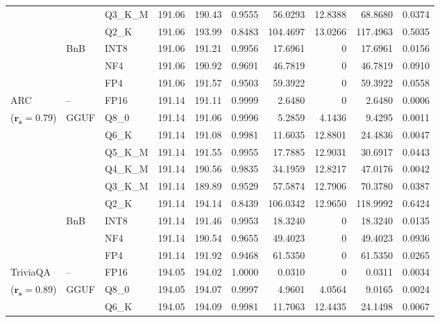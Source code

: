 \begin{longtable}{ll l rrrrrrr}
 &  & Q3\_K\_M & 191.06 & 190.43 & 0.9555 & 56.0293 & 12.8388 & 68.8680 & 0.0374 \\
 &  & Q2\_K & 191.06 & 193.99 & \cellcolor{red!18} 0.8483 & \cellcolor{red!18} 104.4697 & 13.0266 & \cellcolor{red!18} 117.4963 & \cellcolor{red!18} 0.5035 \\
 & BnB & INT8 & 191.06 & 191.21 & 0.9956 & 17.6961 & \cellcolor{cyan!12} $0$ & 17.6961 & 0.0156 \\
 &  & NF4 & 191.06 & 190.92 & 0.9691 & 46.7819 & \cellcolor{cyan!12} $0$ & 46.7819 & 0.0910 \\
 &  & FP4 & 191.06 & 191.57 & 0.9503 & 59.3922 & \cellcolor{cyan!12} $0$ & 59.3922 & 0.0558 \\
\midrule
ARC & -- & FP16 & 191.14 & 191.11 & 0.9999 & 2.6480 & \cellcolor{cyan!12} $0$ & 2.6480 & 0.0006 \\
{\small ($\mathbf{r_s{=}0.79}$)} & GGUF & Q8\_0 & 191.14 & 191.06 & 0.9996 & 5.2859 & 4.1436 & 9.4295 & 0.0011 \\
 &  & Q6\_K & 191.14 & 191.08 & 0.9981 & 11.6035 & 12.8801 & 24.4836 & 0.0047 \\
 &  & Q5\_K\_M & 191.14 & 191.55 & 0.9955 & 17.7885 & 12.9031 & 30.6917 & 0.0443 \\
 &  & Q4\_K\_M & 191.14 & 190.56 & 0.9835 & 34.1959 & 12.8217 & 47.0176 & 0.0042 \\
 &  & Q3\_K\_M & 191.14 & 189.89 & 0.9529 & 57.5874 & 12.7906 & 70.3780 & 0.0387 \\
 &  & Q2\_K & 191.14 & 194.14 & \cellcolor{red!18} 0.8439 & \cellcolor{red!18} 106.0342 & 12.9650 & \cellcolor{red!18} 118.9992 & \cellcolor{red!18} 0.6424 \\
 & BnB & INT8 & 191.14 & 191.46 & 0.9953 & 18.3240 & \cellcolor{cyan!12} $0$ & 18.3240 & 0.0135 \\
 &  & NF4 & 191.14 & 190.54 & 0.9655 & 49.4023 & \cellcolor{cyan!12} $0$ & 49.4023 & 0.0936 \\
 &  & FP4 & 191.14 & 191.92 & \cellcolor{red!18} 0.9468 & \cellcolor{red!18} 61.5350 & \cellcolor{cyan!12} $0$ & \cellcolor{red!18} 61.5350 & \cellcolor{red!18} 0.0265 \\
\midrule
TriviaQA & -- & FP16 & 194.05 & 194.02 & 1.0000 & 0.0310 & \cellcolor{cyan!12} $0$ & 0.0311 & 0.0034 \\
{\small ($\mathbf{r_s{=}0.89}$)} & GGUF & Q8\_0 & 194.05 & 194.07 & 0.9997 & 4.9601 & 4.0564 & 9.0165 & 0.0024 \\
 &  & Q6\_K & 194.05 & 194.09 & 0.9981 & 11.7063 & 12.4435 & 24.1498 & 0.0067 \\

\end{longtable}
